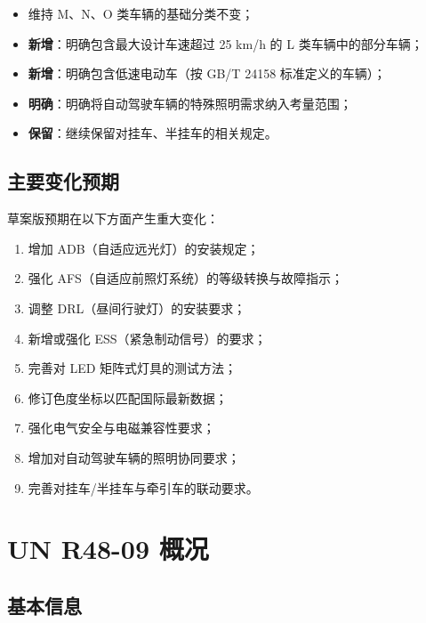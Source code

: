 \begin{itemize}[leftmargin=2em]
    \item 维持 M、N、O 类车辆的基础分类不变；
    \item \textbf{新增}：明确包含最大设计车速超过 25 km/h 的 L 类车辆中的部分车辆；
    \item \textbf{新增}：明确包含低速电动车（按 GB/T 24158 标准定义的车辆）；
    \item \textbf{明确}：明确将自动驾驶车辆的特殊照明需求纳入考量范围；
    \item \textbf{保留}：继续保留对挂车、半挂车的相关规定。
\end{itemize}

\subsection{主要变化预期}

草案版预期在以下方面产生重大变化：

\begin{enumerate}[leftmargin=2em]
    \item 增加 ADB（自适应远光灯）的安装规定；
    \item 强化 AFS（自适应前照灯系统）的等级转换与故障指示；
    \item 调整 DRL（昼间行驶灯）的安装要求；
    \item 新增或强化 ESS（紧急制动信号）的要求；
    \item 完善对 LED 矩阵式灯具的测试方法；
    \item 修订色度坐标以匹配国际最新数据；
    \item 强化电气安全与电磁兼容性要求；
    \item 增加对自动驾驶车辆的照明协同要求；
    \item 完善对挂车/半挂车与牵引车的联动要求。
\end{enumerate}

\section{UN R48-09 概况}

\subsection{基本信息}

